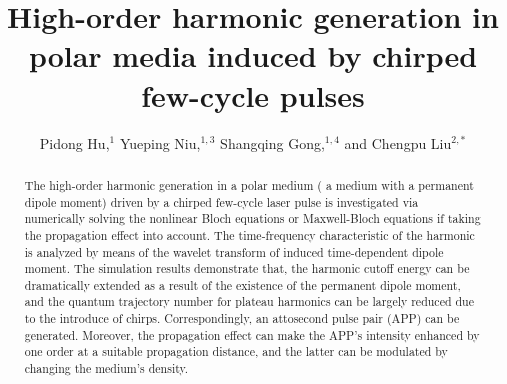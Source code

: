 \documentclass[10pt,letterpaper]{article}
\begin{document}
\title{High-order harmonic generation in polar media induced by chirped few-cycle pulses}

\author{Pidong Hu,$^1$ Yueping Niu,$^{1,3}$ Shangqing Gong,$^{1,4}$  and Chengpu Liu$^{2,*}$}

\address{$^1$Department of Physics, East China University of Science and Technology, \\
Meilong Road 130, Shanghai 200237, China\\
$^2$State Key Laboratory of High Field Laser Physics, Shanghai Institute of Optics and Fine Mechanics, Chinese Academy of Sciences, Qinghe Road 390, Shanghai 201800, China\\
$^{3}$niuyp@ecust.edu.cn\\
$^{4}$sqgong@ecust.edu.cn
}




\begin{abstract}
The high-order harmonic generation in a polar medium ( a medium with a permanent dipole moment) driven by a chirped few-cycle laser pulse is investigated via numerically solving the nonlinear Bloch equations or Maxwell-Bloch equations if taking the propagation effect into account. The time-frequency characteristic of the harmonic is analyzed by means of the wavelet transform of induced time-dependent dipole moment. The simulation results demonstrate that, the harmonic cutoff energy can be dramatically extended as a result of the existence of the permanent dipole moment, and the quantum trajectory number for plateau harmonics can be largely reduced due to the introduce of chirps. Correspondingly, an attosecond pulse pair (APP) can be generated. Moreover, the propagation effect can make the APP's intensity enhanced by one order at a suitable propagation distance, and the latter can be modulated by changing the medium's density.
\end{abstract}

\end{document}
